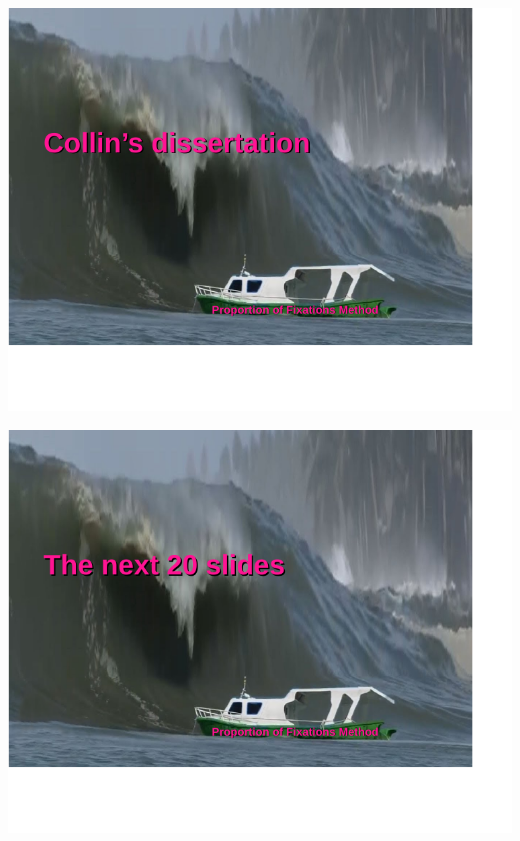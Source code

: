 \documentclass{beamer}
\begin{document}
\begin{frame}
\begin{center}
\includegraphics[scale=1]{boat_meme.pdf}
\end{center}
\end{frame}

\begin{frame}
\begin{center}
\includegraphics[scale=1]{other_boat_meme.pdf}
\end{center}
\end{frame}
\end{document}
